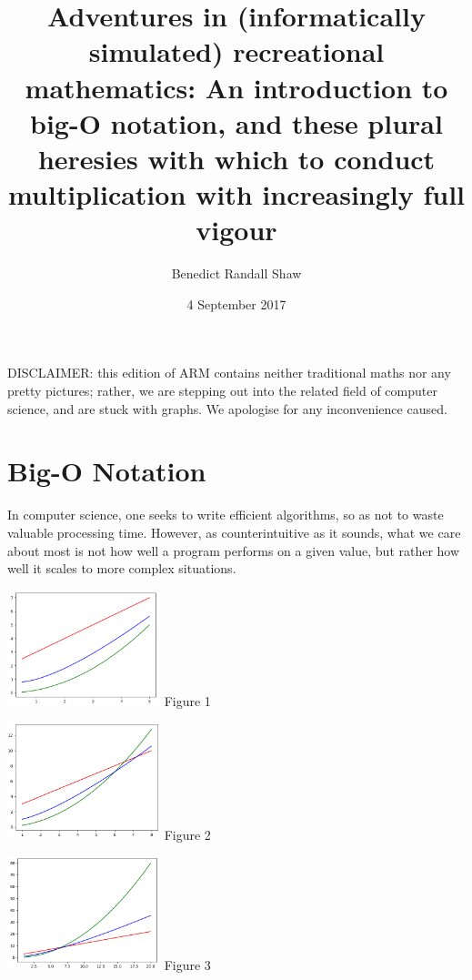 \documentclass[10pt,a4paper]{article}
\newcounter{count}
\begin{document}
\title{Adventures in (informatically simulated) recreational mathematics: An introduction to big-O notation, and these plural heresies with which to conduct multiplication with increasingly full vigour}
\date{4 September 2017}
\author{Benedict Randall Shaw}

\maketitle

\begin{multicols}{2}
	
	DISCLAIMER: this edition of ARM contains neither traditional maths nor any pretty pictures; rather, we are stepping out into the related field of computer science, and are stuck with graphs. We apologise for any inconvenience caused.
	
	\section{Big-O Notation}
	
	In computer science, one seeks to write efficient algorithms, so as not to waste valuable processing time. However, as counterintuitive as it sounds, what we care about most is not how well a program performs on a given value, but rather how well it scales to more complex situations.\\
	
\end{multicols}

\parbox{0.333333333\textwidth}{\centering
	\includegraphics[width=0.33333333333\textwidth]{smallgraph}
	Figure 1}
\parbox{0.333333333\textwidth}{\centering
	\includegraphics[width=0.33333333333\textwidth]{mediumgraph}
	Figure 2}
\parbox{0.333333333\textwidth}{\centering
	\includegraphics[width=0.33333333333\textwidth]{largegraph}
	Figure 3}\\
\end{document}

